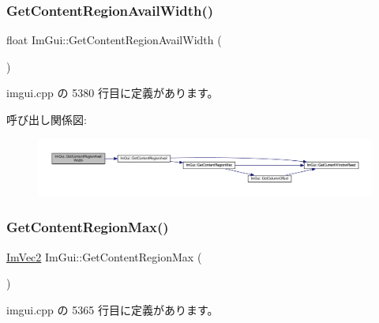 \subsubsection{\texorpdfstring{Get\+Content\+Region\+Avail\+Width()}{GetContentRegionAvailWidth()}}
{\footnotesize\ttfamily float Im\+Gui\+::\+Get\+Content\+Region\+Avail\+Width (\begin{DoxyParamCaption}{ }\end{DoxyParamCaption})}



 imgui.\+cpp の 5380 行目に定義があります。

呼び出し関係図\+:\nopagebreak
\begin{figure}[H]
\begin{center}
\leavevmode
\includegraphics[width=350pt]{namespace_im_gui_a52e3311f46626a5d0369139d20da993a_cgraph}
\end{center}
\end{figure}
\mbox{\label{namespace_im_gui_a0a4dbfabbfa45d74319ef541962ce2eb}} 
\subsubsection{\texorpdfstring{Get\+Content\+Region\+Max()}{GetContentRegionMax()}}
{\footnotesize\ttfamily \mbox{\hyperlink{struct_im_vec2}{Im\+Vec2}} Im\+Gui\+::\+Get\+Content\+Region\+Max (\begin{DoxyParamCaption}{ }\end{DoxyParamCaption})}



 imgui.\+cpp の 5365 行目に定義があります。

